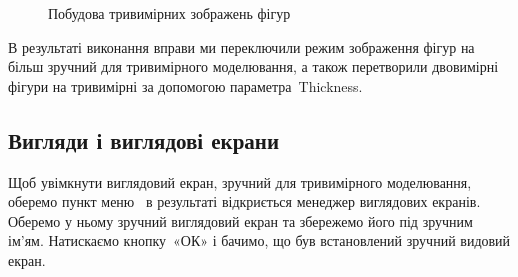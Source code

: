 \documentclass[
	a4paper,
	oneside,
	BCOR = 10mm,
	DIV = 12,
	12pt,
	headings = normal,
]{scrartcl}
\newlength{\gridunitwidth}
\begin{document}
\begin{figure}[!htbp]
\begin{subfigure}[b]{4 \gridunitwidth}
					\caption{}
					\label{subfig:03-figures-3d-hidden}
				\end{subfigure}
				\caption{Побудова тривимірних зображень фігур}
				\label{fig:03-figures-3d}
			\end{figure}

			В результаті виконання вправи ми переключили режим зображення фігур на більш зручний для тривимірного моделювання, а також перетворили двовимірні фігури на тривимірні за допомогою параметра~\textenglish{Thickness}.

		\subsection{Вигляди і виглядові екрани}
			Щоб увімкнути виглядовий екран, зручний для тривимірного моделювання, оберемо пункт меню~ в результаті відкриється менеджер виглядових екранів. Оберемо у ньому зручний виглядовий екран та збережемо його під зручним ім'ям. Натискаємо кнопку~«ОК» і бачимо, що був встановлений зручний видовий екран.
\end{document}
